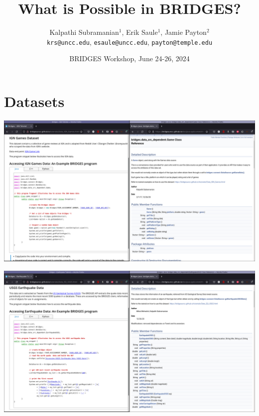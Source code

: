 \documentclass[aspectratio=169]{beamer}
\title{What is Possible in BRIDGES?}
\subtitle{}
\author{Kalpathi Subramanian$^1$, Erik Saule$^1$, Jamie Payton$^2$\\\texttt{krs@uncc.edu}, \texttt{esaule@uncc.edu}, \texttt{payton@temple.edu} }
\institute{$^1$The University of North Carolina at Charlotte\\$^2$Temple University}
\date{BRIDGES Workshop, June 24-26, 2024}
\begin{document}
\begin{frame}
\titlepage
\end{frame}



\section{Datasets}

\begin{frame}
  \includegraphics[width=1.02\linewidth]{dataset_figs/DatasetGame.png}
\end{frame}

\begin{frame}
  \includegraphics[width=1.02\linewidth]{dataset_figs/Earthquake.png}
\end{frame}
\end{document}
